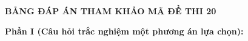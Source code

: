 	
	\newpage
	\begin{center} \textbf{BẢNG ĐÁP ÁN THAM KHẢO MÃ ĐỀ THI 20} \end{center}
	
	\noindent \textbf{Phần I (Câu hỏi trắc nghiệm một phương án lựa chọn):}